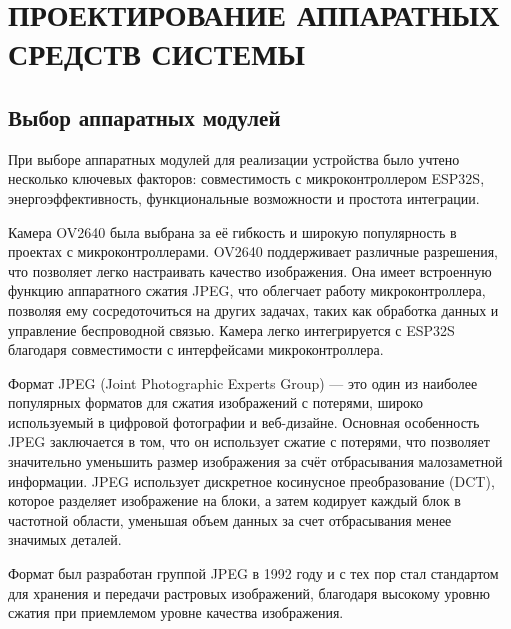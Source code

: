 \chapter[Проектирование аппаратных средств системы]
{ПРОЕКТИРОВАНИЕ АППАРАТНЫХ СРЕДСТВ СИСТЕМЫ}

\section{Выбор аппаратных модулей}\par
\hspace*{12.5 mm}При выборе аппаратных модулей для реализации 
устройства было учтено несколько ключевых факторов: 
совместимость с микроконтроллером ESP32S, энергоэффективность, 
функциональные возможности и простота интеграции. 

    Камера OV2640 была выбрана за её гибкость и широкую 
популярность в проектах с микроконтроллерами. OV2640 
поддерживает различные разрешения, что позволяет легко 
настраивать качество изображения. Она имеет встроенную функцию 
аппаратного сжатия JPEG, что облегчает работу микроконтроллера, 
позволяя ему сосредоточиться на других задачах, таких как 
обработка данных и управление беспроводной связью. Камера легко 
интегрируется с ESP32S благодаря совместимости с 
интерфейсами микроконтроллера.

    Формат JPEG (Joint Photographic Experts Group) — это один из 
наиболее популярных форматов для сжатия изображений с 
потерями, широко используемый в цифровой фотографии и 
веб-дизайне. Основная особенность JPEG заключается в том, 
что он использует сжатие с потерями, что позволяет 
значительно уменьшить размер изображения за счёт отбрасывания 
малозаметной информации. JPEG использует дискретное 
косинусное преобразование (DCT), которое разделяет 
изображение на блоки, а затем кодирует каждый блок в 
частотной области, уменьшая объем данных за счет отбрасывания 
менее значимых деталей.

    Формат был разработан группой JPEG в 1992 году и с тех пор 
стал стандартом для хранения и передачи растровых изображений, 
благодаря высокому уровню сжатия при приемлемом уровне 
качества изображения\cite{GonW}.

